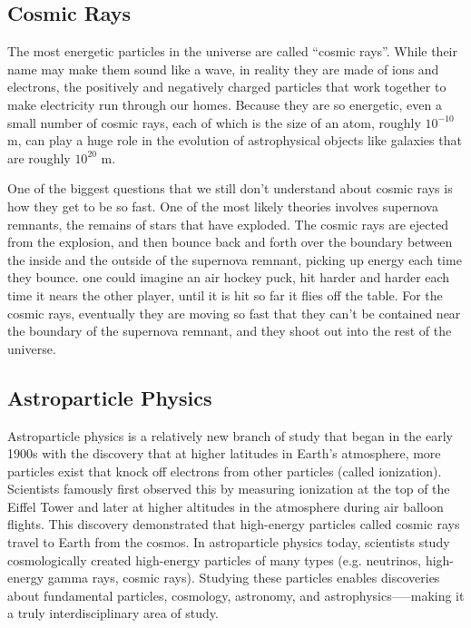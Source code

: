 \subsection{Cosmic Rays} 

The most energetic particles in the universe are called ``cosmic rays''. While their name may make them sound like a wave, in reality they are made of ions and electrons, the positively and negatively charged particles that work together to make electricity run through our homes. Because they are so energetic, even a small number of cosmic rays, each of which is the size of an atom, roughly $10^{-10}$ m, can play a huge role in the evolution of astrophysical objects like galaxies that are roughly $10^{20}$ m. 

One of the biggest questions that we still don't understand about cosmic rays is how they get to be so fast. One of the most likely theories involves supernova remnants, the remains of stars that have exploded. The cosmic rays are ejected from the explosion, and then bounce back and forth over the boundary between the inside and the outside of the supernova remnant, picking up energy each time they bounce. one could imagine an air hockey puck, hit harder and harder each time it nears the other player, until it is hit so far it flies off the table. For the cosmic rays, eventually they are moving so fast that they can't be contained near the boundary of the supernova remnant, and they shoot out into the rest of the universe.

\subsection{Astroparticle Physics}

Astroparticle physics is a relatively new branch of study that began in the early 1900s with the discovery that at higher latitudes in Earth’s atmosphere, more particles exist that knock off electrons from other particles (called ionization). Scientists famously first observed this by measuring ionization at the top of the Eiffel Tower and later at higher altitudes in the atmosphere during air balloon flights. This discovery demonstrated that high-energy particles called cosmic rays travel to Earth from the cosmos. In astroparticle physics today, scientists study cosmologically created high-energy particles of many types (e.g. neutrinos, high-energy gamma rays, cosmic rays). Studying these particles enables discoveries about fundamental particles, cosmology, astronomy, and astrophysics–––making it a truly interdisciplinary area of study. 


